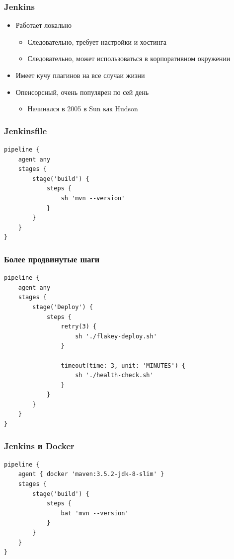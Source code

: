 \documentclass{../../slides-style}
\begin{document}
    \begin{frame}
        \frametitle{Jenkins}
        \begin{itemize}
            \item Работает локально
            \begin{itemize}
                \item Следовательно, требует настройки и хостинга
                \item Следовательно, может использоваться в корпоративном окружении
            \end{itemize}
            \item Имеет кучу плагинов на все случаи жизни
            \item Опенсорсный, очень популярен по сей день
            \begin{itemize}
                \item Начинался в 2005 в Sun как Hudson
            \end{itemize}
        \end{itemize}
    \end{frame}

    \begin{frame}[fragile]
        \frametitle{Jenkinsfile}
        \begin{verbatim}
pipeline {
    agent any
    stages {
        stage('build') {
            steps {
                sh 'mvn --version'
            }
        }
    }
}
        \end{verbatim}
    \end{frame}

    \begin{frame}[fragile]
        \frametitle{Более продвинутые шаги}
        \begin{verbatim}
pipeline {
    agent any
    stages {
        stage('Deploy') {
            steps {
                retry(3) {
                    sh './flakey-deploy.sh'
                }

                timeout(time: 3, unit: 'MINUTES') {
                    sh './health-check.sh'
                }
            }
        }
    }
}
        \end{verbatim}
    \end{frame}

    \begin{frame}[fragile]
        \frametitle{Jenkins и Docker}
        \begin{verbatim}
pipeline {
    agent { docker 'maven:3.5.2-jdk-8-slim' }
    stages {
        stage('build') {
            steps {
                bat 'mvn --version'
            }
        }
    }
}
        \end{verbatim}
    \end{frame}
\end{document}
